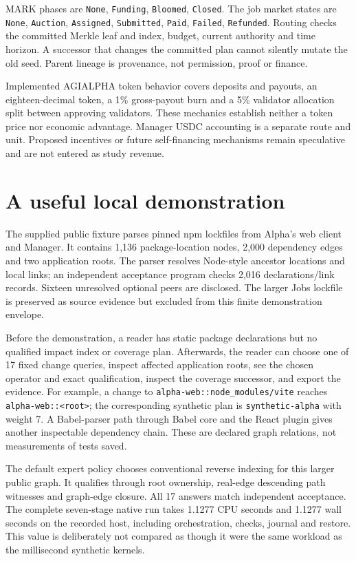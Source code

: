 \begin{samepage}
MARK phases are \texttt{None}, \texttt{Funding}, \texttt{Bloomed}, \texttt{Closed}. The job market states are \texttt{None}, \texttt{Auction}, \texttt{Assigned}, \texttt{Submitted}, \texttt{Paid}, \texttt{Failed}, \texttt{Refunded}. Routing checks the committed Merkle leaf and index, budget, current authority and time horizon. A successor that changes the committed plan cannot silently mutate the old seed. Parent lineage is provenance, not permission, proof or finance.
\end{samepage}

Implemented AGIALPHA token behavior covers deposits and payouts, an eighteen-decimal token, a 1\% gross-payout burn and a 5\% validator allocation split between approving validators. These mechanics establish neither a token price nor economic advantage. Manager USDC accounting is a separate route and unit. Proposed incentives or future self-financing mechanisms remain speculative and are not entered as study revenue.

\FloatBarrier
\section{A useful local demonstration}
\label{sec:demo}
The supplied public fixture parses pinned npm lockfiles from Alpha's web client and Manager. It contains 1,136 package-location nodes, 2,000 dependency edges and two application roots. The parser resolves Node-style ancestor locations and local links; an independent acceptance program checks 2,016 declarations/link records. Sixteen unresolved optional peers are disclosed. The larger Jobs lockfile is preserved as source evidence but excluded from this finite demonstration envelope.

Before the demonstration, a reader has static package declarations but no qualified impact index or coverage plan. Afterwards, the reader can choose one of 17 fixed change queries, inspect affected application roots, see the chosen operator and exact qualification, inspect the coverage successor, and export the evidence. For example, a change to \texttt{alpha-web::node\_modules/vite} reaches \texttt{alpha-web::<root>}; the corresponding synthetic plan is \texttt{synthetic-alpha} with weight 7. A Babel-parser path through Babel core and the React plugin gives another inspectable dependency chain. These are declared graph relations, not measurements of tests saved.

The default expert policy chooses conventional reverse indexing for this larger public graph. It qualifies through root ownership, real-edge descending path witnesses and graph-edge closure. All 17 answers match independent acceptance. The complete seven-stage native run takes 1.1277 CPU seconds and 1.1277 wall seconds on the recorded host, including orchestration, checks, journal and restore. This value is deliberately not compared as though it were the same workload as the millisecond synthetic kernels.

